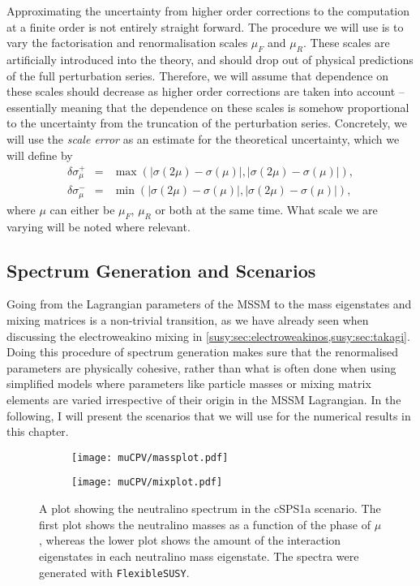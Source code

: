 \documentclass[../main.tex]{subfiles}
\begin{document}
Approximating the uncertainty from higher order corrections to the computation at a finite order is not entirely straight forward.
The procedure we will use is to vary the factorisation and renormalisation scales \(\mu_F\) and \(\mu_R\).
These scales are artificially introduced into the theory, and should drop out of physical predictions of the full perturbation series.
Therefore, we will assume that dependence on these scales should decrease as higher order corrections are taken into account -- essentially meaning that the dependence on these scales is somehow proportional to the uncertainty from the truncation of the perturbation series.
Concretely, we will use the \emph{scale error} as an estimate for the theoretical uncertainty, which we will define by
\begin{subequations}
  \begin{eqnarray}
    \delta\sigma_{\mu}^+ &=& \operatorname{max}(|\sigma(2\mu) - \sigma(\mu)|, |\sigma(2\mu) - \sigma(\mu)|), \\
    \delta\sigma_{\mu}^- &=& \operatorname{min}(|\sigma(2\mu) - \sigma(\mu)|, |\sigma(2\mu) - \sigma(\mu)|),
  \end{eqnarray}
\end{subequations}
where \(\mu\) can either be \(\mu_F\), \(\mu_R\) or both at the same time.
What scale we are varying will be noted where relevant.



\subsection{Spectrum Generation and Scenarios}
Going from the Lagrangian parameters of the MSSM to the mass eigenstates and mixing matrices is a non-trivial transition, as we have already seen when discussing the electroweakino mixing in \cref{susy:sec:electroweakinos,susy:sec:takagi}.
Doing this procedure of spectrum generation makes sure that the renormalised parameters are physically cohesive, rather than what is often done when using simplified models where parameters like particle masses or mixing matrix elements are varied irrespective of their origin in the MSSM Lagrangian.
In the following, I will present the scenarios that we will use for the numerical results in this chapter.

\begin{figure}[ht!]
  \centering
  \begin{subfigure}{\textwidth}
    \centering
    \texttt{[image: muCPV/massplot.pdf]}
    \caption{}
  \end{subfigure}
  \begin{subfigure}{\textwidth}
    \centering
    \texttt{[image: muCPV/mixplot.pdf]}
    \caption{}
  \end{subfigure}
  \caption{A plot showing the neutralino spectrum in the cSPS1a scenario. The first plot shows the neutralino masses as a function of the phase of \(\mu\), whereas the lower plot shows the amount of the interaction eigenstates in each neutralino mass eigenstate. The spectra were generated with \texttt{FlexibleSUSY}.}
  \label{res:fig:csps1a_scenario}
\end{figure}
\end{document}
